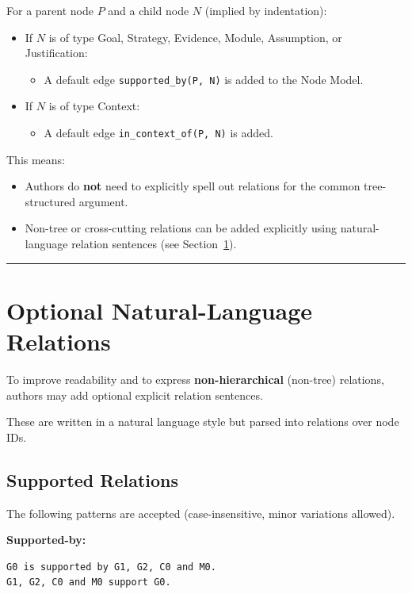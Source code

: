 \documentclass[11pt]{article}
\begin{document}
For a parent node \(P\) and a child node \(N\) (implied by indentation):
\begin{itemize}[leftmargin=2em]
  \item If \(N\) is of type Goal, Strategy, Evidence, Module, Assumption, or Justification:
  \begin{itemize}[leftmargin=1.5em]
    \item A default edge \texttt{supported\_by(P, N)} is added to the Node Model.
  \end{itemize}

  \item If \(N\) is of type Context:
  \begin{itemize}[leftmargin=1.5em]
    \item A default edge \texttt{in\_context\_of(P, N)} is added.
  \end{itemize}
\end{itemize}

This means:
\begin{itemize}[leftmargin=2em]
  \item Authors do \textbf{not} need to explicitly spell out relations for the common tree-structured argument.
  \item Non-tree or cross-cutting relations can be added explicitly using natural-language relation sentences (see Section~\ref{sec:nl-relations}).
\end{itemize}

\bigskip
\hrule
\bigskip

\section{Optional Natural-Language Relations}
\label{sec:nl-relations}

To improve readability and to express \textbf{non-hierarchical} (non-tree) relations, authors may add optional explicit relation sentences.

These are written in a natural language style but parsed into relations over node IDs.

\subsection{Supported Relations}

The following patterns are accepted (case-insensitive, minor variations allowed).

\textbf{Supported-by:}
\begin{verbatim}
G0 is supported by G1, G2, C0 and M0.
G1, G2, C0 and M0 support G0.
\end{verbatim}
\end{document}
